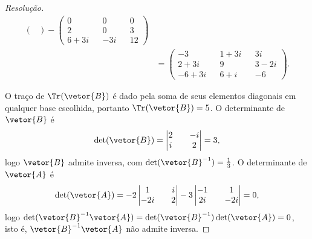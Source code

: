 \begin{proof}[Resolução]
\begin{align*}
\begin{pmatrix}
                                          \end{pmatrix}-
                                          \begin{pmatrix}
                                              0 && 0 && 0\\
                                              2 && 0 && 3\\
                                              6+3i && -3i && 12
                                          \end{pmatrix}\\
                                          &= \begin{pmatrix}
                                              -3 && 1+3i && 3i\\
                                              2 + 3i && 9 && 3 - 2i\\
                                              -6+3i && 6 + i && -6
                                          \end{pmatrix}.
    \end{align*}

    O traço de \(\Tr(\vetor{B})\) é dado pela soma de seus elementos diagonais em qualquer base escolhida, portanto \(\Tr(\vetor{B}) = 5\). O determinante de \(\vetor{B}\) é
    \begin{equation*}
        \det(\vetor{B}) = \begin{vmatrix}
            2 && -i\\
            i && 2
        \end{vmatrix} = 3,
    \end{equation*}
    logo \(\vetor{B}\) admite inversa, com \(\det(\vetor{B}^{-1}) = \frac13\). O determinante de \(\vetor{A}\) é
    \begin{equation*}
        \det(\vetor{A}) = -2 \begin{vmatrix}
            1 && i\\
            -2i && 2
        \end{vmatrix} - 3 \begin{vmatrix}
            -1 && 1\\
            2i && -2i
        \end{vmatrix} = 0,
    \end{equation*}
    logo \(\det(\vetor{B}^{-1}\vetor{A}) = \det(\vetor{B}^{-1})\det(\vetor{A}) = 0\), isto é, \(\vetor{B}^{-1}\vetor{A}\) não admite inversa.
\end{proof}

